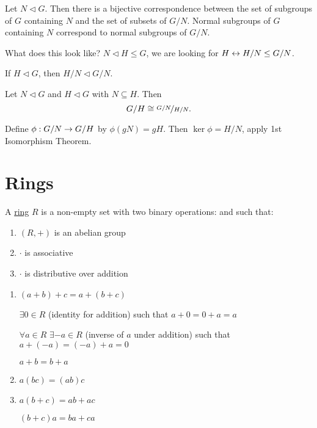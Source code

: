 \documentclass[]{article}
\begin{document}
\begin{theorem}
	Let $N\triangleleft G$. Then there is a bijective correspondence between the set of subgroups of $G$ containing $N$ and the set of subsets of $G/N$.
	Normal subgroups of $G$ containing $N$ correspond to normal subgroups of $G/N$.
\end{theorem}
\begin{remark}
	What does this look like? $N\triangleleft H\leq G$, we are looking for $H \leftrightarrow H/N\leq G/N$.
\end{remark}
\begin{note}
	If $H\triangleleft G$, then $H/N\triangleleft G/N$.
\end{note}
\begin{theorem}
	Let $N\triangleleft G$ and $H\triangleleft G$ with $N\subseteq H$. Then
	$$ G/H \cong \nicefrac{G/N}{H/N}.$$
\end{theorem}
Define $\phi: G/N\rightarrow G/H$ by $\phi(gN)=gH$. Then $\ker\phi = H/N$, apply 1st Isomorphism Theorem.

\section{Rings}

\begin{definition}
	A \ul{ring} $R$ is a non-empty set with two binary operations:  and  such that:
	\begin{enumerate}
		\item $(R,+)$ is an abelian group
		\item $\cdot$ is associative
		\item $\cdot$ is distributive over addition
	\end{enumerate}
\end{definition}
\begin{enumerate}
	\item $(a+b)+c = a+(b+c)$
	
		$\exists 0\in R$ (identity for addition) such that $a+0=0+a=a$
	
		$\forall a\in R$ $\exists -a\in R$ (inverse of $a$ under addition) such that $a+(-a)=(-a)+a = 0$

		$a+b=b+a$
	\item $a(bc) = (ab)c$
	\item $a(b+c) = ab+ac$
		
		$(b+c)a = ba+ca$
\end{enumerate}
\end{document}
